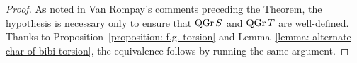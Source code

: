 \begin{proof}
  As noted in Van Rompay's comments preceding the Theorem, the hypothesis is necessary only to ensure that \(\operatorname{QGr}S\) and \(\operatorname{QGr}T\) are well-defined.
  Thanks to Proposition~\ref{proposition: f.g. torsion} and Lemma~\ref{lemma: alternate char of bibi torsion}, the equivalence follows by running the same argument.
\end{proof}
